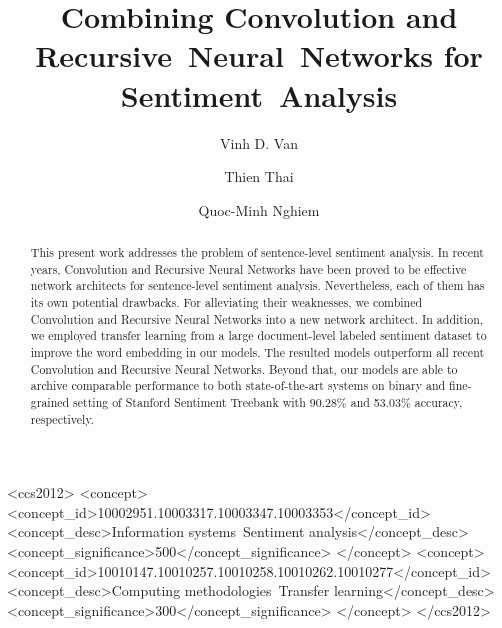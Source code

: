 \documentclass[sigconf]{acmart}
\begin{document}
\title{Combining Convolution and Recursive~Neural~Networks for Sentiment~Analysis}

\author{Vinh D. Van}

\author{Thien Thai}

\author{Quoc-Minh Nghiem}

\renewcommand{\shortauthors}{V. Van et al.}


\begin{abstract}
This present work addresses the problem of sentence-level sentiment analysis.
In recent years, Convolution and Recursive Neural Networks have been proved to be effective network architects for sentence-level sentiment analysis.
Nevertheless, each of them has its own potential drawbacks.
For alleviating their weaknesses, we combined Convolution and Recursive Neural Networks into a new network architect.
In addition, we employed transfer learning from a large document-level labeled sentiment dataset to improve the word embedding in our models.
The resulted models outperform all recent Convolution and Recursive Neural Networks.
Beyond that, our models are able to archive comparable performance to both state-of-the-art systems on binary and fine-grained setting of Stanford Sentiment Treebank with 90.28\% and 53.03\% accuracy, respectively. 

\end{abstract}

%
%
\begin{CCSXML}
	<ccs2012>
	<concept>
	<concept_id>10002951.10003317.10003347.10003353</concept_id>
	<concept_desc>Information systems~Sentiment analysis</concept_desc>
	<concept_significance>500</concept_significance>
	</concept>
	<concept>
	<concept_id>10010147.10010257.10010258.10010262.10010277</concept_id>
	<concept_desc>Computing methodologies~Transfer learning</concept_desc>
	<concept_significance>300</concept_significance>
	</concept>
	</ccs2012>
\end{CCSXML}
\end{document}
